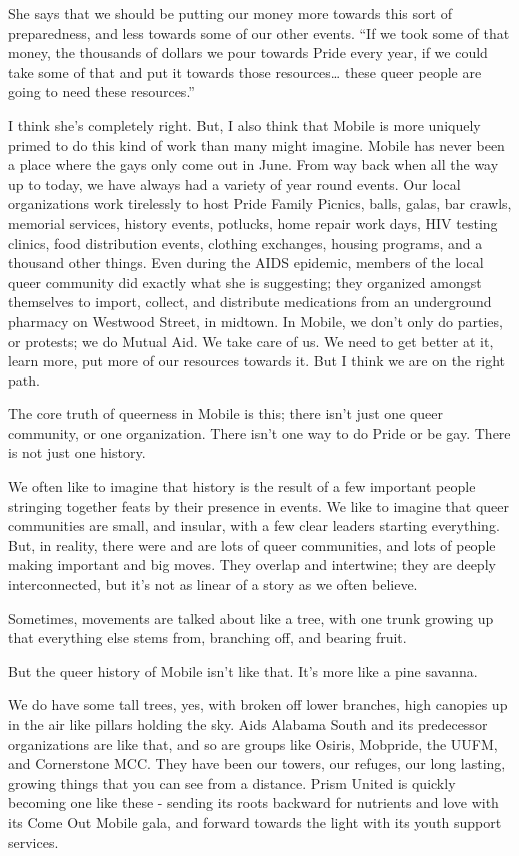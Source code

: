 \documentclass[
]{book}
\begin{document}
She says that we should be putting our money more towards this sort of preparedness, and less towards some of our other events. ``If we took some of that money, the thousands of dollars we pour towards Pride every year, if we could take some of that and put it towards those resources\ldots{} these queer people are going to need these resources.''

I think she's completely right. But, I also think that Mobile is more uniquely primed to do this kind of work than many might imagine. Mobile has never been a place where the gays only come out in June. From way back when all the way up to today, we have always had a variety of year round events. Our local organizations work tirelessly to host Pride Family Picnics, balls, galas, bar crawls, memorial services, history events, potlucks, home repair work days, HIV testing clinics, food distribution events, clothing exchanges, housing programs, and a thousand other things. Even during the AIDS epidemic, members of the local queer community did exactly what she is suggesting; they organized amongst themselves to import, collect, and distribute medications from an underground pharmacy on Westwood Street, in midtown. In Mobile, we don't only do parties, or protests; we do Mutual Aid. We take care of us. We need to get better at it, learn more, put more of our resources towards it. But I think we are on the right path.

The core truth of queerness in Mobile is this; there isn't just one queer community, or one organization. There isn't one way to do Pride or be gay. There is not just one history.

We often like to imagine that history is the result of a few important people stringing together feats by their presence in events. We like to imagine that queer communities are small, and insular, with a few clear leaders starting everything. But, in reality, there were and are lots of queer communities, and lots of people making important and big moves. They overlap and intertwine; they are deeply interconnected, but it's not as linear of a story as we often believe.

Sometimes, movements are talked about like a tree, with one trunk growing up that everything else stems from, branching off, and bearing fruit.

But the queer history of Mobile isn't like that. It's more like a pine savanna.

We do have some tall trees, yes, with broken off lower branches, high canopies up in the air like pillars holding the sky. Aids Alabama South and its predecessor organizations are like that, and so are groups like Osiris, Mobpride, the UUFM, and Cornerstone MCC. They have been our towers, our refuges, our long lasting, growing things that you can see from a distance. Prism United is quickly becoming one like these - sending its roots backward for nutrients and love with its Come Out Mobile gala, and forward towards the light with its youth support services.
\end{document}
